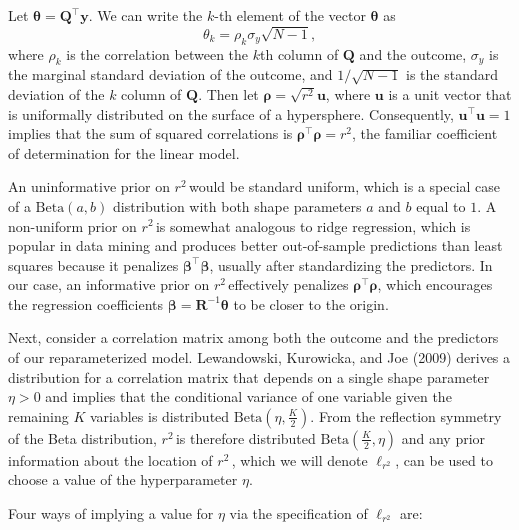 \documentclass[11pt]{article}
\newcommand{\Rsq}{$r^2\,$}
\newcommand{\boldrho}{\boldsymbol{\rho}}
\newcommand{\boldbeta}{\boldsymbol{\beta}}
\newcommand{\boldtheta}{\boldsymbol{\theta}}
\newcommand{\y}{\mathbf{y}}
\newcommand{\Q}{\mathbf{Q}}
\newcommand{\R}{\mathbf{R}}
\newcommand{\locRsq}{\ell_{r^2}}
\newcommand{\halfK}{\frac{K}{2}}
\newcommand{\Betadist}[2]{\mathrm{Beta}\left(#1,#2\right)}
\begin{document}
Let $\boldtheta = \Q^\top \y$. We can write the $k$-th element of the vector
$\boldtheta$ as
$$\theta_k = \rho_k \sigma_y \sqrt{N - 1},$$
where $\rho_k$ is the correlation between the $k$th column of $\Q$ and the
outcome, $\sigma_y$ is the marginal standard deviation of the outcome, and
$1/\sqrt{N-1}$ is the standard deviation of the $k$ column of $\Q$. Then let
$\boldrho = \sqrt{r^2}\mathbf{u}$, where $\mathbf{u}$ is a unit vector that is
uniformally distributed on the surface of a hypersphere. Consequently,
$\mathbf{u}^\top \mathbf{u} = 1$ implies that the sum of squared correlations is
$\boldrho^\top \boldrho = r^2$, the familiar coefficient of determination for
the linear model.

An uninformative prior on \Rsq would be standard uniform, which is a special
case of a $\Betadist{a}{b}$ distribution with both shape parameters $a$ and
$b$ equal to $1$. A non-uniform prior on \Rsq is somewhat analogous to ridge
regression, which is popular in data mining and produces better out-of-sample
predictions than least squares because it penalizes $\boldbeta^\top \boldbeta$,
usually after standardizing the predictors. In our case, an informative prior on
\Rsq effectively penalizes $\boldrho^\top \boldrho$, which encourages the
regression coefficients $\boldbeta = \R^{-1} \boldtheta$ to be closer to the
origin.

Next, consider a correlation matrix among both the outcome and the predictors of
our reparameterized model. Lewandowski, Kurowicka, and Joe (2009) derives a
distribution for a correlation matrix that depends on a single shape parameter
$\eta > 0$ and implies that the conditional variance of one variable given the
remaining $K$ variables is distributed $\Betadist{\eta}{\halfK}$. From the
reflection symmetry of the Beta distribution, \Rsq is therefore distributed
$\Betadist{\halfK}{\eta}$ and any prior information about the location of \Rsq,
which we will denote $\locRsq$, can be used to choose a value of the
hyperparameter $\eta$.

Four ways of implying a value for $\eta$ via the specification of $\locRsq$ are:
\end{document}
